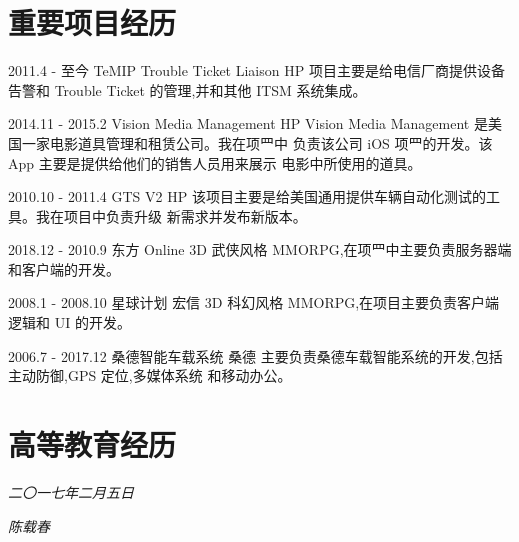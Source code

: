 \documentclass[]{friggeri-cv}
\begin{document}
\section{\cuti 重要项目经历}
\begin{entrylist}
  \entry
    {2011.4 - 至今}
    {\cuti TeMIP Trouble Ticket Liaison}
    {HP}
    {项目主要是给电信厂商提供设备告警和 Trouble Ticket 的管理,并和其他 ITSM 系统集成。\\}

    \entry
    {2014.11 - 2015.2}
    {\cuti Vision Media Management}
    {HP}
    {Vision Media Management 是美国一家电影道具管理和租赁公司。我在项⺫中 负责该公司 iOS 项⺫的开发。该 App 主要是提供给他们的销售人员用来展示 电影中所使用的道具。\\}

    \entry
    {2010.10 - 2011.4}
    {\cuti GTS V2}
    {HP}
    {该项目主要是给美国通用提供⻋辆自动化测试的工具。我在项目中负责升级 新需求并发布新版本。\\}
    
    \entry
    {2018.12 - 2010.9}
    {\cuti 东方 Online}
    {}
    {3D 武侠⻛格 MMORPG,在项⺫中主要负责服务器端和客户端的开发。 \\}

    \entry
    {2008.1 - 2008.10}
    {\cuti 星球计划}
    {宏信}
    {3D 科幻⻛格 MMORPG,在项目主要负责客户端逻辑和 UI 的开发。\\}

    \entry
    {2006.7 - 2017.12}
    {\cuti 桑德智能⻋载系统}
    {桑德}
    {主要负责桑德⻋载智能系统的开发,包括主动防御,GPS 定位,多媒体系统 和移动办公。\\}
\end{entrylist}

\section{\cuti 高等教育经历}
\begin{entrylist}
  \entry
    {2002 - 2006}
    {\cuti 软件工程 学士学位}
    {重庆大学软件学院}
    {\\}
  \\}
\end{entrylist}

\vspace{40pt}

\begin{flushright}
\emph{二〇一七年二月五日}
\end{flushright}
\begin{flushright}
\emph{陈载春}
\end{flushright}
\end{document}
